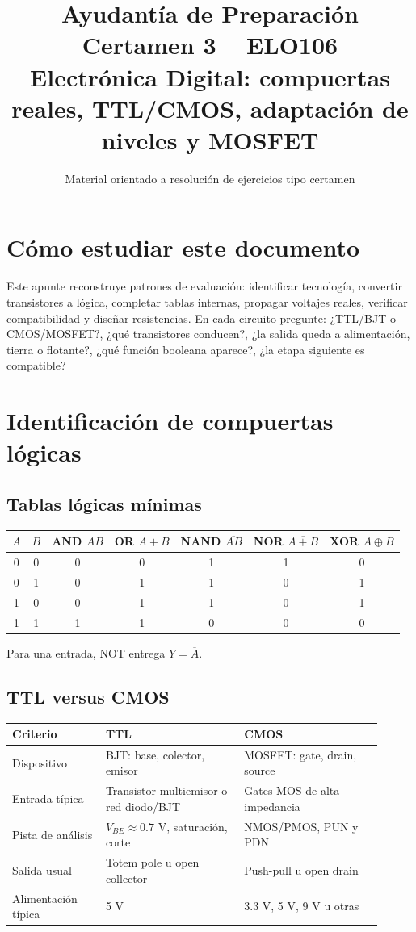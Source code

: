\documentclass[11pt,letterpaper]{article}
\title{Ayudantía de Preparación Certamen 3 -- ELO106\\\large Electrónica Digital: compuertas reales, TTL/CMOS, adaptación de niveles y MOSFET}
\author{Material orientado a resolución de ejercicios tipo certamen}\date{}
\newcommand{\NOT}[1]{\overline{#1}}\newcommand{\VDD}{V_{DD}}\newcommand{\VCC}{V_{CC}}\newcommand{\VOH}{V_{OH}}\newcommand{\VOL}{V_{OL}}\newcommand{\VIH}{V_{IH}}\newcommand{\VIL}{V_{IL}}
\begin{document}
\maketitle\tableofcontents\newpage
\section*{Cómo estudiar este documento}
Este apunte reconstruye patrones de evaluación: identificar tecnología, convertir transistores a lógica, completar tablas internas, propagar voltajes reales, verificar compatibilidad y diseñar resistencias. En cada circuito pregunte: ¿TTL/BJT o CMOS/MOSFET?, ¿qué transistores conducen?, ¿la salida queda a alimentación, tierra o flotante?, ¿qué función booleana aparece?, ¿la etapa siguiente es compatible?

\section{Identificación de compuertas lógicas}
\subsection{Tablas lógicas mínimas}
\begin{center}\begin{tabular}{cc|ccccc}\toprule
$A$&$B$&AND $AB$&OR $A+B$&NAND $\NOT{AB}$&NOR $\NOT{A+B}$&XOR $A\oplus B$\\\midrule
0&0&0&0&1&1&0\\0&1&0&1&1&0&1\\1&0&0&1&1&0&1\\1&1&1&1&0&0&0\\\bottomrule
\end{tabular}\end{center}
Para una entrada, NOT entrega $Y=\NOT{A}$.
\subsection{TTL versus CMOS}
\begin{resumen}\begin{tabular}{p{0.23\linewidth}p{0.34\linewidth}p{0.34\linewidth}}\toprule
Criterio&TTL&CMOS\\\midrule
Dispositivo&BJT: base, colector, emisor&MOSFET: gate, drain, source\\
Entrada típica&Transistor multiemisor o red diodo/BJT&Gates MOS de alta impedancia\\
Pista de análisis&$V_{BE}\approx0.7$ V, saturación, corte&NMOS/PMOS, PUN y PDN\\
Salida usual&Totem pole u open collector&Push-pull u open drain\\
Alimentación típica&5 V&3.3 V, 5 V, 9 V u otras\\\bottomrule
\end{tabular}\end{resumen}
\end{document}
